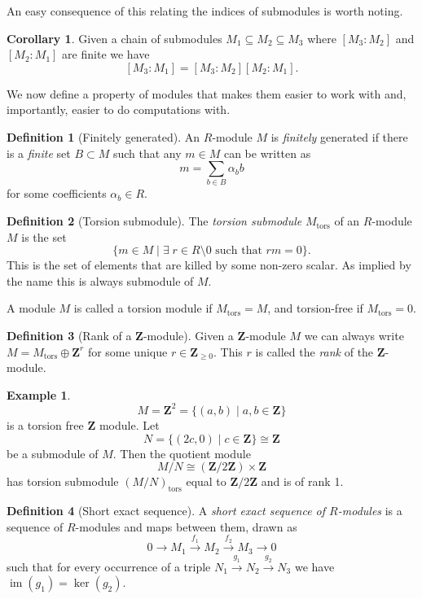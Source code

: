 \documentclass[12pt,a4paper,abstracton,bibtotoc]{scrreprt}
\theoremstyle{definition}
\newtheorem{cor}{Corollary}
\newtheorem{defn}{Definition}
\newtheorem{ex}{Example}
\newcommand{\ZZ}{\mathbf{Z}}
\DeclareMathOperator{\im}{im}
\begin{document}
An easy consequence of this relating the indices of submodules is worth noting.

\begin{cor}
\label{cor:indexmult}
Given a chain of submodules $M_1 \subseteq M_2 \subseteq M_3$ where $[M_3:M_2]$ and $[M_2:M_1]$ are finite we have
\[
[M_3:M_1] = [M_3:M_2][M_2:M_1].
\] %
\end{cor}

\minisec{}
We now define a property of modules that makes them easier to work with and, importantly, easier to do computations with.

\begin{defn}[Finitely generated]
An $R$-module $M$ is \emph{finitely} generated if there is a \emph{finite} set $B\subset M$ such that any $m\in M$ can be written as
\[m = \sum_{b\in B} \alpha_b b\]
for some coefficients $\alpha_b \in R$.
\end{defn}

\begin{defn}[Torsion submodule]
The \emph{torsion submodule} $M_\text{tors}$ of an $R$-module $M$ is the set
\[
\{m\in M \mid \exists\; r \in R\setminus 0 \text{ such that } rm = 0\}.
\]
This is the set of elements that are killed by some non-zero scalar.
As implied by the name this is always submodule of $M$.
\end{defn}

A module $M$ is called a torsion module if $M_\text{tors} = M$, and torsion-free if $M_\text{tors} = 0$.


\begin{defn}[Rank of a $\ZZ$-module]
Given a $\ZZ$-module $M$ we can always write $M = M_\text{tors} \oplus \ZZ^r$ for some unique $r\in \ZZ_{\ge 0}$.
This $r$ is called the \emph{rank} of the $\ZZ$-module.
\end{defn}

\begin{ex}
\[M = \ZZ^2 = \{(a,b)\mid a,b\in \ZZ\}\]
is a torsion free $\ZZ$ module. Let
\[N = \{(2c,0) \mid c\in\ZZ\} \cong \ZZ\]
be a submodule of $M$.
Then the quotient module
\[M/N \cong (\ZZ/2\ZZ)\times \ZZ\]
has torsion submodule $(M/N)_\text{tors}$ equal to $\ZZ/2\ZZ$ and is of rank 1.
\end{ex}

\begin{defn}[Short exact sequence]
A \emph{short exact sequence of $R$-modules} is a sequence of $R$-modules and maps between them, drawn as
\[
0 \to M_1 \xrightarrow{f_1} M_2 \xrightarrow{f_2} M_3 \to 0
\]
such that for every occurrence of a triple $N_1 \xrightarrow{g_1} N_2 \xrightarrow{g_2} N_3$ we have $\im(g_1) = \ker(g_2)$.
\end{defn}
\end{document}
